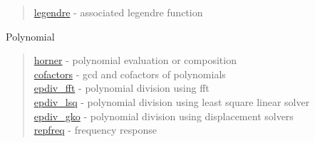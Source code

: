 \begin{quote}
\noindent
\hyperlink{legendre}{legendre} - associated legendre function\\
\end{quote}

Polynomial

\begin{quote}
\noindent
\hyperlink{horner}{horner} - polynomial evaluation or composition \\
\hyperlink{cofactors}{cofactors} - gcd and cofactors of polynomials \\
\hyperlink{epdiv_fft}{epdiv\_fft} - {polynomial division using fft}\\
\hyperlink{epdiv_lsq}{epdiv\_lsq} - {polynomial division using least square linear solver}\\
\hyperlink{epdiv_gko}{epdiv\_gko} - { polynomial division using displacement solvers}\\
\hyperlink{repfreq}{repfreq} - {frequency response} \\
\end{quote}














